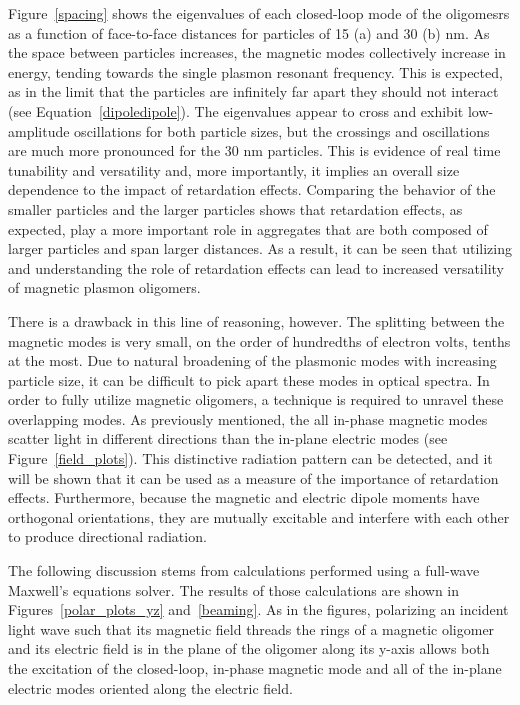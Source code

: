 \documentclass[12pt, letterpaper, twoside]{report}
\begin{document}
Figure~\ref{spacing} shows the eigenvalues of each closed-loop mode of the oligomesrs as a function of face-to-face distances for particles of 15 (a) and 30 (b) nm. As the space between particles increases, the magnetic modes collectively increase in energy, tending towards the single plasmon resonant frequency. This is expected, as in the limit that the particles are infinitely far apart they should not interact (see Equation~\ref{dipoledipole}). The eigenvalues appear to cross and exhibit low-amplitude oscillations for both particle sizes, but the crossings and oscillations are much more pronounced for the 30 nm particles. This is evidence of real time tunability and versatility and, more importantly, it implies an overall size dependence to the impact of retardation effects. Comparing the behavior of the smaller particles and the larger particles shows that retardation effects, as expected, play a more important role in aggregates that are both composed of larger particles and span larger distances. As a result, it can be seen that utilizing and understanding the role of retardation effects can lead to increased versatility of magnetic plasmon oligomers.

There is a drawback in this line of reasoning, however. The splitting between the magnetic modes is very small, on the order of hundredths of electron volts, tenths at the most. Due to natural broadening of the plasmonic modes with increasing particle size, it can be difficult to pick apart these modes in optical spectra. In order to fully utilize magnetic oligomers, a technique is required to unravel these overlapping modes. As previously mentioned, the all in-phase magnetic modes scatter light in different directions than the in-plane electric modes (see Figure~\ref{field_plots}). This distinctive radiation pattern can be detected\cite{Polman2014,Smith2014}, and it will be shown that it can be used as a measure of the importance of retardation effects. Furthermore, because the magnetic and electric dipole moments have orthogonal orientations, they are mutually excitable and interfere with each other to produce directional radiation\cite{Kivshar2012,Tsutomu2017}.

The following discussion stems from calculations performed using a full-wave Maxwell's equations solver\cite{Hohenester2012}. The results of those calculations are shown in Figures~\ref{polar_plots_yz} and~\ref{beaming}. As in the figures, polarizing an incident light wave such that its magnetic field threads the rings of a magnetic oligomer and its electric field is in the plane of the oligomer along its y-axis allows both the excitation of the closed-loop, in-phase magnetic mode and all of the in-plane electric modes oriented along the electric field.
\end{document}
